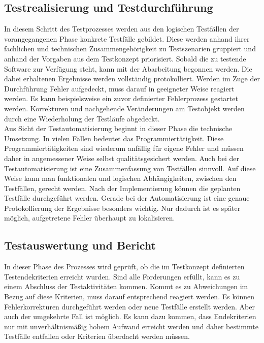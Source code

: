 \subsection{Testrealisierung und Testdurchführung}
\label{subsec:testrealisierung_und_durchführung}
In diesem Schritt des Testprozesses werden aus den logischen Testfällen der vorangegangenen Phase konkrete Testfälle gebildet.
Diese werden anhand ihrer fachlichen und technischen Zusammengehörigkeit zu Testszenarien gruppiert und anhand der Vorgaben aus dem Testkonzept priorisiert.
Sobald die zu testende Software zur Verfügung steht, kann mit der Abarbeitung begonnen werden. Die dabei erhaltenen Ergebnisse werden vollständig protokolliert. Werden im Zuge der Durchführung Fehler aufgedeckt, muss darauf in geeigneter Weise reagiert werden. Es kann beispielsweise ein zuvor definierter Fehlerprozess gestartet werden.
Korrekturen und nachgehende Veränderungen am Testobjekt werden durch eine Wiederholung der Testläufe abgedeckt.\\
Aus Sicht der Testautomatisierung beginnt in dieser Phase die technische Umsetzung.
In vielen Fällen bedeutet das Programmiertätigkeit. Diese Programmiertätigkeiten sind wiederum anfällig für eigene Fehler und müssen daher in angemessener Weise selbst qualitätsgesichert werden. Auch bei der Testautomatisierung ist eine Zusammenfassung von Testfällen sinnvoll. Auf diese Weise kann man funktionalen und logischen Abhängigkeiten, zwischen den Testfällen, gerecht werden.
Nach der Implementierung können die geplanten Testfälle durchgeführt werden.
Gerade bei der Automatisierung ist eine genaue Protokollierung der Ergebnisse besonders wichtig.
Nur dadurch ist es später möglich, aufgetretene Fehler überhaupt zu lokalisieren.


\subsection{Testauswertung und Bericht}
\label{subsec:testauswertung_und_bericht}
In dieser Phase des Prozesses wird geprüft, ob die im Testkonzept definierten Testendekriterien erreicht wurden. Sind alle Forderungen erfüllt, kann es zu einem Abschluss der Testaktivitäten kommen. Kommt es zu Abweichungen im Bezug auf diese Kriterien, muss darauf entsprechend reagiert werden. Es können Fehlerkorrekturen durchgeführt werden oder neue Testfälle erstellt werden. Aber auch der umgekehrte Fall ist möglich. Es kann dazu kommen, dass Endekriterien nur mit unverhältnismäßig hohem Aufwand erreicht werden 
und daher bestimmte Testfälle entfallen oder Kriterien überdacht werden müssen.

